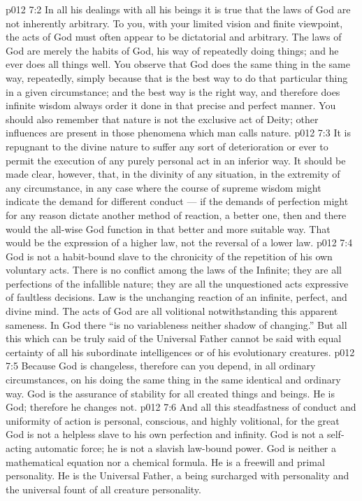 \vs p012 7:2 \pc In all his dealings with all his beings it is true that the laws of God are not inherently arbitrary. To you, with your limited vision and finite viewpoint, the acts of God must often appear to be dictatorial and arbitrary. The laws of God are merely the habits of God, his way of repeatedly doing things; and he ever does all things well. You observe that God does the same thing in the same way, repeatedly, simply because that is the best way to do that particular thing in a given circumstance; and the best way is the right way, and therefore does infinite wisdom always order it done in that precise and perfect manner. You should also remember that nature is not the exclusive act of Deity; other influences are present in those phenomena which man calls nature.
\vs p012 7:3 It is repugnant to the divine nature to suffer any sort of deterioration or ever to permit the execution of any purely personal act in an inferior way. It should be made clear, however, that,  in the divinity of any situation, in the extremity of any circumstance, in any case where the course of supreme wisdom might indicate the demand for different conduct --- if the demands of perfection might for any reason dictate another method of reaction, a better one, then and there would the all\hyp{}wise God function in that better and more suitable way. That would be the expression of a higher law, not the reversal of a lower law.
\vs p012 7:4 God is not a habit\hyp{}bound slave to the chronicity of the repetition of his own voluntary acts. There is no conflict among the laws of the Infinite; they are all perfections of the infallible nature; they are all the unquestioned acts expressive of faultless decisions. Law is the unchanging reaction of an infinite, perfect, and divine mind. The acts of God are all volitional notwithstanding this apparent sameness. In God there “is no variableness neither shadow of changing.” But all this which can be truly said of the Universal Father cannot be said with equal certainty of all his subordinate intelligences or of his evolutionary creatures.
\vs p012 7:5 Because God is changeless, therefore can you depend, in all ordinary circumstances, on his doing the same thing in the same identical and ordinary way. God is the assurance of stability for all created things and beings. He is God; therefore he changes not.
\vs p012 7:6 And all this steadfastness of conduct and uniformity of action is personal, conscious, and highly volitional, for the great God is not a helpless slave to his own perfection and infinity. God is not a self\hyp{}acting automatic force; he is not a slavish law\hyp{}bound power. God is neither a mathematical equation nor a chemical formula. He is a freewill and primal personality. He is the Universal Father, a being surcharged with personality and the universal fount of all creature personality.

